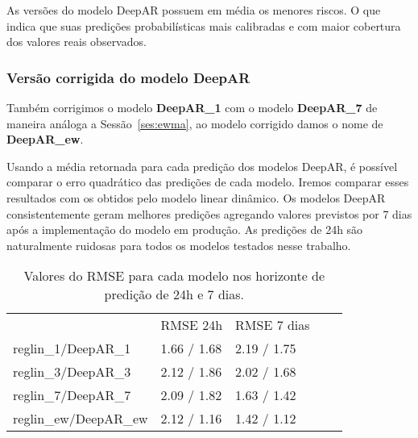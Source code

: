 As versões do modelo DeepAR possuem em média os menores riscos. O que indica que
suas predições probabilísticas mais calibradas e com maior cobertura dos valores
reais observados.


\subsubsection{Versão corrigida do modelo DeepAR}

Também corrigimos o modelo \textbf{DeepAR\_1} com o modelo \textbf{DeepAR\_7} de maneira análoga a
Sessão~\ref{ses:ewma}, ao modelo corrigido damos o nome de \textbf{DeepAR\_ew}.

Usando a média retornada para cada predição dos modelos DeepAR, é possível
comparar o erro quadrático das predições de cada modelo. Iremos comparar esses resultados com os obtidos pelo modelo
linear dinâmico. Os modelos DeepAR consistentemente geram melhores predições agregando valores previstos por 7 dias
após a implementação do modelo em produção. As predições de 24h são naturalmente
ruidosas para todos os modelos testados nesse trabalho.

\begin{center}
\begin{table}[]
  \centering
  \begin{tabular}{l|llll}
    \cline{2-3}
    & \multicolumn{1}{l|}{RMSE 24h} & \multicolumn{1}{l|}{RMSE 7 dias} &  \\ \cline{1-3}
    \multicolumn{1}{|l|}{reglin\_1/DeepAR\_1} & 1.66 / 1.68                   & 2.19 / 1.75                      &  \\ \cline{1-1}
    \multicolumn{1}{|l|}{reglin\_3/DeepAR\_3} & 2.12 / 1.86                   & 2.02 / 1.68                      &  \\ \cline{1-1}
    \multicolumn{1}{|l|}{reglin\_7/DeepAR\_7} & 2.09 / 1.82                   & 1.63 / 1.42                      &  \\ \cline{1-1}
    \multicolumn{1}{|l|}{reglin\_ew/DeepAR\_ew} & 2.12 / 1.16                   & 1.42 / 1.12                      &  \\ \cline{1-1}
  \end{tabular}
  \caption{Valores do RMSE para cada modelo nos horizonte de predição de 24h e 7 dias.}
\label{tb:rmsedeepar}
\end{table}
\end{center}